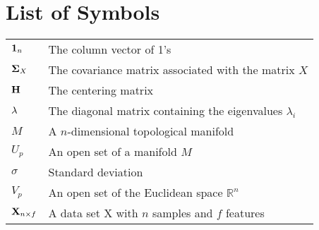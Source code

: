 \chapter*{List of Symbols}

\begin{table}[htbp]
	\begin{tabularx}{\textwidth}{XX}
		$\mathbf{1}_n$                         & The column vector of 1's \bigstrut\\
		$\mathbf{\Sigma}_X$ 		    & The covariance matrix associated with the matrix $X$ \bigstrut\\
		$\mathbf{H}$ 						   & The centering matrix \bigstrut \\
		$\mathbf{\lambda}$ 			  & The diagonal matrix containing the eigenvalues $\lambda_i$ \bigstrut\\
		$M$ 						  & A $n$-dimensional topological manifold \bigstrut\\
		$U_p$ 						& An open set of a manifold $M$ \bigstrut\\
		$\sigma$ 				& Standard deviation \bigstrut\\
		$V_p$ 						& An open set of the Euclidean space $\mathbb{R}^n$ \bigstrut\\
		$\mathbf{X}_{n \times f}$  & A data set X with $n$ samples and $f$ features \bigstrut\\
	\end{tabularx}
\end{table}
